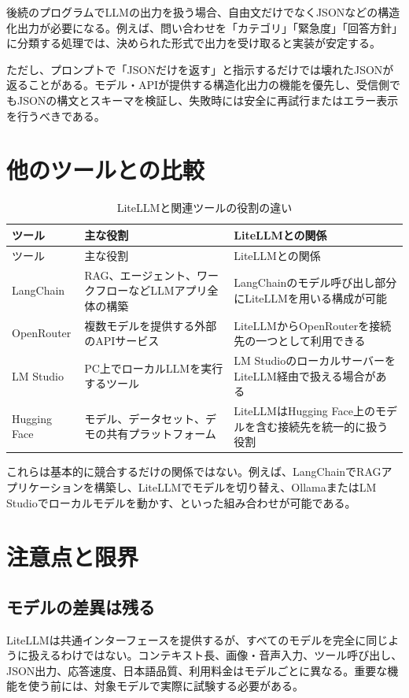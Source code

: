 \documentclass[a4paper,11pt]{jsarticle}
\begin{document}
後続のプログラムでLLMの出力を扱う場合、自由文だけでなくJSONなどの構造化出力が必要になる。例えば、問い合わせを「カテゴリ」「緊急度」「回答方針」に分類する処理では、決められた形式で出力を受け取ると実装が安定する。

ただし、プロンプトで「JSONだけを返す」と指示するだけでは壊れたJSONが返ることがある。モデル・APIが提供する構造化出力の機能を優先し、受信側でもJSONの構文とスキーマを検証し、失敗時には安全に再試行またはエラー表示を行うべきである。

\section{他のツールとの比較}

\begin{longtable}{p{28mm}p{43mm}p{74mm}}
\caption{LiteLLMと関連ツールの役割の違い} \\
\toprule
ツール & 主な役割 & LiteLLMとの関係 \\
\midrule
\endfirsthead
\toprule
ツール & 主な役割 & LiteLLMとの関係 \\
\midrule
\endhead
LangChain & RAG、エージェント、ワークフローなどLLMアプリ全体の構築 & LangChainのモデル呼び出し部分にLiteLLMを用いる構成が可能 \\
OpenRouter & 複数モデルを提供する外部のAPIサービス & LiteLLMからOpenRouterを接続先の一つとして利用できる \\
LM Studio & PC上でローカルLLMを実行するツール & LM StudioのローカルサーバーをLiteLLM経由で扱える場合がある \\
Hugging Face & モデル、データセット、デモの共有プラットフォーム & LiteLLMはHugging Face上のモデルを含む接続先を統一的に扱う役割 \\
\bottomrule
\end{longtable}

これらは基本的に競合するだけの関係ではない。例えば、LangChainでRAGアプリケーションを構築し、LiteLLMでモデルを切り替え、OllamaまたはLM Studioでローカルモデルを動かす、といった組み合わせが可能である。

\section{注意点と限界}

\subsection{モデルの差異は残る}

LiteLLMは共通インターフェースを提供するが、すべてのモデルを完全に同じように扱えるわけではない。コンテキスト長、画像・音声入力、ツール呼び出し、JSON出力、応答速度、日本語品質、利用料金はモデルごとに異なる。重要な機能を使う前には、対象モデルで実際に試験する必要がある。
\end{document}

